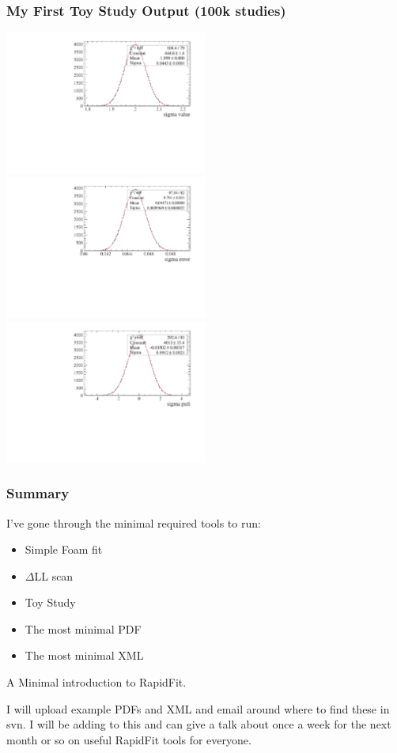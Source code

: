 \documentclass{beamer}
\begin{document}
\begin{frame}
\frametitle{My First Toy Study Output (100k studies) }\begin{center}
\includegraphics[width=0.5\textwidth]{./Output-100k/sigma_value_c_thru.pdf}
\includegraphics[width=0.5\textwidth]{./Output-100k/sigma_error_c_thru.pdf}\newline
\includegraphics[width=0.5\textwidth]{./Output-100k/sigma_pull_c_thru.pdf}\end{center}
\end{frame}

\begin{frame}
\frametitle{Summary}
I've gone through the minimal required tools to run:\newline
\begin{itemize}
 \item Simple Foam fit
 \item $\Delta$LL scan
 \item Toy Study
 \item The most minimal PDF
 \item The most minimal XML\newline
\end{itemize}
A Minimal introduction to RapidFit.\newline

I will upload example PDFs and XML and email around where to find these in svn. I will be adding to this and can give a talk about once a week for the next month or so on useful RapidFit tools for everyone.
\end{frame}
\end{document}
